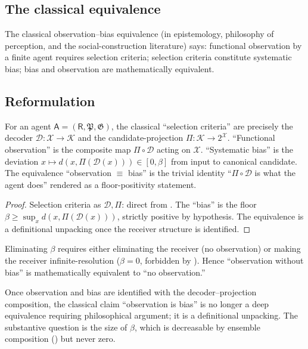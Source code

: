 \documentclass[11pt,a4paper]{article}
\newcommand{\K}{\mathcal{K}}
\newcommand{\D}{\mathcal{D}}
\newcommand{\X}{\mathcal{X}}
\newcommand{\Method}{\mathfrak{P}}
\newcommand{\Goal}{\mathfrak{G}}
\newcommand{\receiver}{\mathsf{R}}
\newcommand{\agent}{\mathsf{A}}
\begin{document}
\subsection{The classical equivalence}

The classical observation--bias equivalence
(in epistemology, philosophy of perception, and the social-construction
literature) says: functional observation by a finite agent requires
selection criteria; selection criteria constitute systematic bias;
bias and observation are mathematically equivalent.

\subsection{Reformulation}

\begin{theorem}\label{thm:bias-decoder}
For an agent $\agent=(\receiver,\Method,\Goal)$, the classical
``selection criteria'' are precisely the decoder $\D:\X\to\K$ and
the candidate-projection $\Pi:\K\to 2^\X$.
``Functional observation'' is the composite map $\Pi\circ\D$ acting
on $\X$. ``Systematic bias'' is the deviation
$x\mapsto d(x,\Pi(\D(x)))\in[0,\beta]$ from input to canonical
candidate. The equivalence
``observation $\equiv$ bias'' is the trivial identity
``$\Pi\circ\D$ is what the agent does'' rendered as a
floor-positivity statement.
\end{theorem}

\begin{proof}
Selection criteria as $\D,\Pi$: direct from . The
``bias'' is the floor $\beta\ge\sup_x d(x,\Pi(\D(x)))$,
strictly positive by hypothesis. The equivalence is a definitional
unpacking once the receiver structure is identified.
\end{proof}

\begin{corollary}
\label{cor:no-elim}
Eliminating $\beta$ requires either eliminating the receiver
(no observation) or making the receiver infinite-resolution
($\beta=0$, forbidden by ). Hence ``observation
without bias'' is mathematically equivalent to ``no observation.''
\end{corollary}

\begin{remark}\label{rem:obs-rhetoric}
Once observation and bias are identified with the decoder--projection
composition, the classical claim ``observation is bias'' is no longer
a deep equivalence requiring philosophical
argument; it is a definitional unpacking. The substantive question
is the size of $\beta$, which is decreasable by ensemble composition
() but never zero.
\end{remark}
\end{document}
